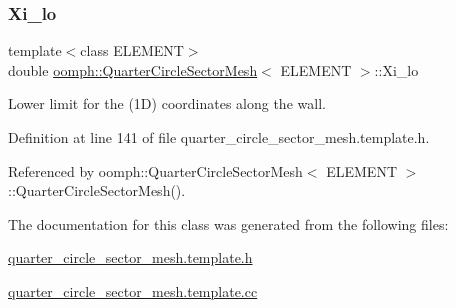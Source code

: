 \mbox{\label{classoomph_1_1QuarterCircleSectorMesh_ab5c1e4484c69eb78bd3323321605a93c}} 
\subsubsection{\texorpdfstring{Xi\+\_\+lo}{Xi\_lo}}
{\footnotesize\ttfamily template$<$class E\+L\+E\+M\+E\+NT$>$ \\
double \hyperlink{classoomph_1_1QuarterCircleSectorMesh}{oomph\+::\+Quarter\+Circle\+Sector\+Mesh}$<$ E\+L\+E\+M\+E\+NT $>$\+::Xi\+\_\+lo\hspace{0.3cm}{\ttfamily [protected]}}



Lower limit for the (1D) coordinates along the wall. 



Definition at line 141 of file quarter\+\_\+circle\+\_\+sector\+\_\+mesh.\+template.\+h.



Referenced by oomph\+::\+Quarter\+Circle\+Sector\+Mesh$<$ E\+L\+E\+M\+E\+N\+T $>$\+::\+Quarter\+Circle\+Sector\+Mesh().



The documentation for this class was generated from the following files\+:\begin{DoxyCompactItemize}
\item 
\hyperlink{quarter__circle__sector__mesh_8template_8h}{quarter\+\_\+circle\+\_\+sector\+\_\+mesh.\+template.\+h}\item 
\hyperlink{quarter__circle__sector__mesh_8template_8cc}{quarter\+\_\+circle\+\_\+sector\+\_\+mesh.\+template.\+cc}\end{DoxyCompactItemize}
